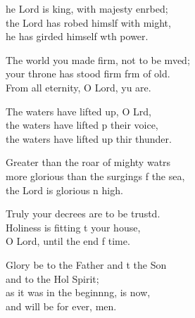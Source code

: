 \settowidth{\versewidth}{more glorious than the surgings of the sea, *}
\begin{psalmverse}%
  \begin{patverse}
he Lord is king, with majesty enrbed;\Flex\\
    the Lord has robed himslf with might,\Med\\
    he has girded himself w\pointup{\i}th power.

The world you made firm, not to be mved;\Flex\\
    your throne has stood firm frm of old.\Med\\
    From all eternity, O Lord, yu are.

The waters have lifted up, O Lrd,\Flex\\
    the waters have lifted p their voice,\Med\\
    the waters have lifted up thir thunder.

Greater than the roar of mighty watrs\Flex\\
    more glorious than the surgings f the sea,\Med\\
    the Lord is glorious n high.

Truly your decrees are to be trustd.\Flex\\
    Holiness is fitting t your house,\Med\\
    O Lord, until the end f time.

Glory be to the Father and t the Son\Med\\
    and to the Hol Spirit;\\
as it was in the beginn\pointup{\i}ng, is now,\Med\\
    and will be for ever, men.
  \end{patverse}
\end{psalmverse}
